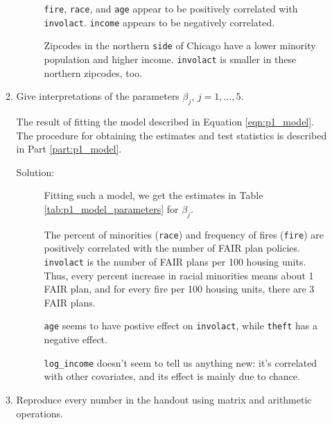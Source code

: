 \documentclass[letterpaper,11pt]{article}
\begin{document}
\begin{enumerate}
\begin{enumerate}
\begin{description}
      \texttt{fire}, \texttt{race}, and \texttt{age} appear to be positively
      correlated with \texttt{involact}. \texttt{income} appears to be
      negatively correlated.

      Zipcodes in the northern \texttt{side} of Chicago have a lower minority
      population and higher income. \texttt{involact} is smaller in these
      northern zipcodes, too.
    \end{description}
  \item Give interpretations of the parameters $\beta_j$, $j = 1,\ldots,5$.
    \label{part:p1b}
    \begin{table}
      \centering
      
      \caption{The result of fitting the model described in Equation
        \ref{eqn:p1_model}. The procedure for obtaining the estimates and test
        statistics is described in Part \ref{part:p1_model}.}
      \label{tab:p1_model_parameters}
    \end{table}

    \begin{description}
    \item[Solution:] Fitting such a model, we get the estimates in Table
      \ref{tab:p1_model_parameters} for $\beta_j$.

      The percent of minorities (\texttt{race}) and frequency of fires
      (\texttt{fire}) are positively correlated with the number of FAIR plan
      policies. \texttt{involact} is the number of FAIR plans per 100 housing
      units. Thus, every percent increase in racial minorities means about 1
      FAIR plan, and for every fire per 100 housing units, there are 3 FAIR
      plans.

      \texttt{age} seems to have postive effect on \texttt{involact}, while
      \texttt{theft} has a negative effect.

      \texttt{log\_income} doesn't seem to tell us anything new: it's correlated
      with other covariates, and its effect is mainly due to chance.      
    \end{description}
    
  \item Reproduce every number in the handout using matrix and arithmetic
    operations.
    \label{part:p1_model}


\end{enumerate}
\end{enumerate}
\end{document}
